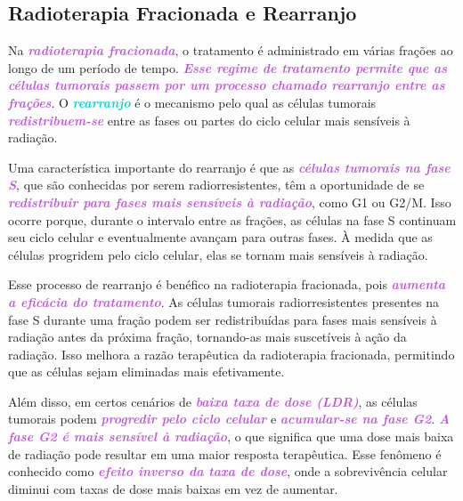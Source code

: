 \documentclass[11pt,a4paper]{article}
\begin{document}
\subsection*{Radioterapia Fracionada e Rearranjo}

	Na \textcolor{MediumOrchid}{\textbf{\textit{radioterapia fracionada}}}, o tratamento é administrado em várias frações ao longo de um período de tempo. \textcolor{MediumOrchid}{\textbf{\textit{Esse regime de tratamento permite que as células tumorais passem por um processo chamado rearranjo entre as frações}}}. O \textcolor{DarkTurquoise}{\textbf{\textit{rearranjo}}} é o mecanismo pelo qual as células tumorais \textcolor{MediumOrchid}{\textbf{\textit{redistribuem-se}}} entre as fases ou partes do ciclo celular mais sensíveis à radiação.

	Uma característica importante do rearranjo é que as \textcolor{MediumOrchid}{\textbf{\textit{células tumorais na fase S}}}, que são conhecidas por serem radiorresistentes, têm a oportunidade de se \textcolor{MediumOrchid}{\textbf{\textit{redistribuir para fases mais sensíveis à radiação}}}, como G1 ou G2/M. Isso ocorre porque, durante o intervalo entre as frações, as células na fase S continuam seu ciclo celular e eventualmente avançam para outras fases. À medida que as células progridem pelo ciclo celular, elas se tornam mais sensíveis à radiação.

	Esse processo de rearranjo é benéfico na radioterapia fracionada, pois \textcolor{MediumOrchid}{\textbf{\textit{aumenta a eficácia do tratamento}}}. As células tumorais radiorresistentes presentes na fase S durante uma fração podem ser redistribuídas para fases mais sensíveis à radiação antes da próxima fração, tornando-as mais suscetíveis à ação da radiação. Isso melhora a razão terapêutica da radioterapia fracionada, permitindo que as células sejam eliminadas mais efetivamente.

	Além disso, em certos cenários de \textcolor{MediumOrchid}{\textbf{\textit{baixa taxa de dose (LDR)}}}, as células tumorais podem \textcolor{MediumOrchid}{\textbf{\textit{progredir pelo ciclo celular}}} e \textcolor{MediumOrchid}{\textbf{\textit{acumular-se na fase G2}}}. \textcolor{MediumOrchid}{\textbf{\textit{A fase G2 é mais sensível à radiação}}}, o que significa que uma dose mais baixa de radiação pode resultar em uma maior resposta terapêutica. Esse fenômeno é conhecido como \textcolor{MediumOrchid}{\textbf{\textit{efeito inverso da taxa de dose}}}, onde a sobrevivência celular diminui com taxas de dose mais baixas em vez de aumentar.
\end{document}
